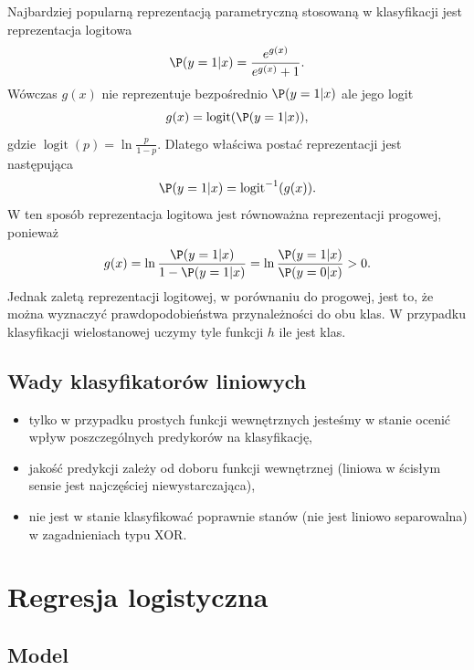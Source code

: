 \documentclass[
]{book}
\providecommand{\tightlist}{%
  \setlength{\itemsep}{0pt}\setlength{\parskip}{0pt}}
\newcommand{\logit}{\operatorname{logit}}
\theoremstyle{plain}
\theoremstyle{definition}
\theoremstyle{definition}
\theoremstyle{definition}
\theoremstyle{definition}
\theoremstyle{remark}
\begin{document}
Najbardziej popularną reprezentacją parametryczną stosowaną w klasyfikacji jest reprezentacja logitowa
\begin{equation}
    \P(y=1|x)=\frac{e^{g(x)}}{e^{g(x)}+1}.
\end{equation}
Wówczas \(g(x)\) nie reprezentuje bezpośrednio \(\P(y=1|x)\) ale jego logit
\begin{equation}
    g(x)=\logit(\P(y=1|x)),
\end{equation}
gdzie \(\logit(p)=\ln\frac{p}{1-p}\). Dlatego właściwa postać reprezentacji jest następująca
\begin{equation}
    \P(y=1|x)=\logit^{-1}(g(x)).
\end{equation}
W ten sposób reprezentacja logitowa jest równoważna reprezentacji progowej, ponieważ
\begin{equation}
    g(x)=\ln\frac{\P(y=1|x)}{1-\P(y=1|x)}=\ln\frac{\P(y=1|x)}{\P(y=0|x)}>0.
\end{equation}
Jednak zaletą reprezentacji logitowej, w porównaniu do progowej, jest to, że można wyznaczyć prawdopodobieństwa przynależności do obu klas. W przypadku klasyfikacji wielostanowej uczymy tyle funkcji \(h\) ile jest klas.

\hypertarget{wady-klasyfikatoruxf3w-liniowych}{%
\section{Wady klasyfikatorów liniowych}\label{wady-klasyfikatoruxf3w-liniowych}}

\begin{itemize}
\tightlist
\item
  tylko w przypadku prostych funkcji wewnętrznych jesteśmy w stanie ocenić wpływ poszczególnych predykorów na klasyfikację,
\item
  jakość predykcji zależy od doboru funkcji wewnętrznej (liniowa w ścisłym sensie jest najczęściej niewystarczająca),
\item
  nie jest w stanie klasyfikować poprawnie stanów (nie jest liniowo separowalna) w zagadnieniach typu XOR.
\end{itemize}

\hypertarget{regresja-logistyczna}{%
\chapter{Regresja logistyczna}\label{regresja-logistyczna}}

\hypertarget{model-1}{%
\section{Model}\label{model-1}}
\end{document}
